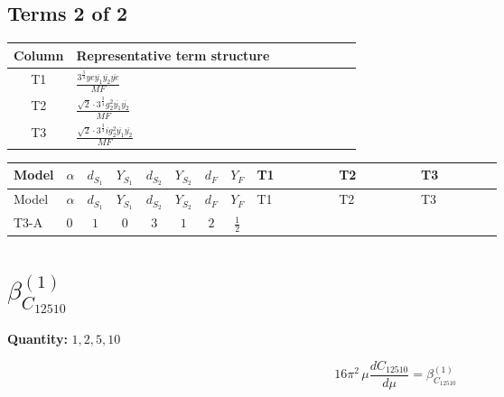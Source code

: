 \documentclass[8pt]{article}
\begin{document}
\begin{landscape}
\subsection*{Terms 2 of 2}
\begin{center}
\begin{tabular}{@{}c >{\raggedright\arraybackslash}p{0.82\linewidth}@{}}
\toprule
Column & Representative term structure \\
\midrule
T1 & \(\displaystyle \frac{3^{\frac{3}{4}} ye \overline{y_{1}} \overline{y_{2}} \overline{ye}}{MF}\) \\
\midrule
T2 & \(\displaystyle \frac{\sqrt{2} \cdot 3^{\frac{3}{4}} g_{2}^{2} \overline{y_{1}} \overline{y_{2}}}{MF}\) \\
\midrule
T3 & \(\displaystyle \frac{\sqrt{2} \cdot 3^{\frac{3}{4}} i g_{2}^{2} \overline{y_{1}} \overline{y_{2}}}{MF}\) \\
\midrule
\bottomrule
\end{tabular}
\end{center}
\smallskip
\tiny
\begin{longtable}{@{}llcccccc >{\raggedright\arraybackslash}p{0.21\linewidth} >{\raggedright\arraybackslash}p{0.21\linewidth} >{\raggedright\arraybackslash}p{0.21\linewidth}@{}}
\toprule
Model & $\alpha$ & $d_{S_1}$ & $Y_{S_1}$ & $d_{S_2}$ & $Y_{S_2}$ & $d_F$ & $Y_F$ & T1 & T2 & T3 \\
\midrule
\endfirsthead
\toprule
Model & $\alpha$ & $d_{S_1}$ & $Y_{S_1}$ & $d_{S_2}$ & $Y_{S_2}$ & $d_F$ & $Y_F$ & T1 & T2 & T3 \\
\midrule
\endhead
T3-A & $0$ & $1$ & $0$ & $3$ & $1$ & $2$ & $\frac{1}{2}$ & \scriptsize\adjustbox{max width=\linewidth}{$\begin{gathered} - \frac{3^{\frac{3}{4}} ye \overline{y_{1}} \overline{y_{2}} \overline{ye}}{12 MF}\end{gathered}$} & \scriptsize\adjustbox{max width=\linewidth}{$\begin{gathered} \frac{\sqrt{2} \cdot 3^{\frac{3}{4}} g_{2}^{2} \overline{y_{1}} \overline{y_{2}}}{6 MF}\end{gathered}$} & \scriptsize\adjustbox{max width=\linewidth}{$\begin{gathered} - \frac{\sqrt{2} \cdot 3^{\frac{3}{4}} i g_{2}^{2} \overline{y_{1}} \overline{y_{2}}}{6 MF}\end{gathered}$} \\
\midrule
\bottomrule
\end{longtable}
\clearpage
\section*{$\beta_{C_{12510}}^{(1)}$}
\noindent\textbf{Quantity: }$\mathrm{1,2,5,10}$\par\smallskip
\[16\pi^2\,\mu\frac{d C_{12510}}{d\mu}=\beta_{C_{12510}}^{(1)}\]

\end{landscape}
\end{document}

